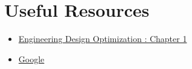 \documentclass[12pt]{article}
\begin{document}

\section{Useful Resources}
\begin{itemize}
	\item \href{http://flowlab.groups.et.byu.net/mdobook.pdf}{Engineering Design Optimization : Chapter 1}
	\item \href{https://www.google.com/}{Google}
\end{itemize}	
\end{document}
